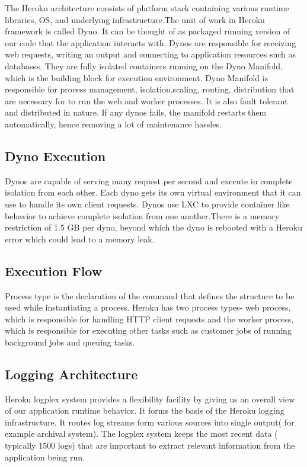 \documentclass[9pt,twocolumn,twoside]{../../styles/osajnl}
\begin{document}
	The Heroku architecture consists of platform stack containing various runtime
	libraries, OS, and underlying infrastructure.The unit of work in Heroku
	framework is called Dyno. It can be thought of as packaged running version of
	our code that the application interacts with. Dynos are responsible for
	receiving web requests, writing an output and connecting to application
	resources such as databases. They are fully isolated containers running on the
	Dyno Manifold, which is the building block for execution environment. Dyno
	Manifold is responsible for process management, isolation,scaling, routing,
	distribution that are necessary for to run the web and worker processes. It is
	also fault tolerant and distributed in nature. If any dynos fails, the manifold
	restarts them automatically, hence removing a lot of maintenance hassles.

        
\subsection{Dyno Execution}
	 Dynos are capable of serving many request per second and execute in complete
	 isolation from each other. Each dyno gets its own virtual environment that it
	 can use to handle its own client requests. Dynos use LXC to provide container
	 like behavior to achieve complete isolation from one another.There is a memory
	 restriction of 1.5 GB per dyno, beyond which the dyno is rebooted with a
	 Heroku error which could lead to a memory leak.

\subsection{Execution Flow}
	Process type is the declaration of the command that defines the structure to be
	used while instantiating a process. Heroku has two process types- web process,
	which is responsible for handling HTTP client requests and the worker process,
	which is responsible for executing other tasks such as customer jobs of running
	background jobs and queuing tasks.



\subsection{Logging Architecture}
	Heroku logplex system provides a flexibility facility by giving us an overall
	view of our application runtime behavior. It forms the basis of the Heroku
	logging  infrastructure. It routes log streams form various sources into single
	output( for example archival system). The logplex system keeps the most recent
	data ( typically 1500 logs) that are important to extract relevant information
	from the application  being run.
\end{document}
